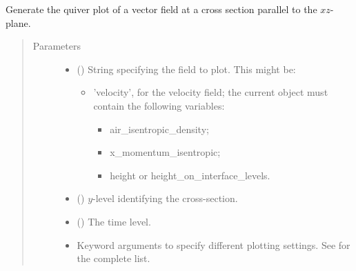 \documentclass[letterpaper,10pt,english]{sphinxmanual}
\begin{document}
\begin{fulllineitems}
\begin{fulllineitems}
\begin{quote}
\begin{description}
\begin{itemize}
\end{itemize}

\end{description}\end{quote}

\end{fulllineitems}


\begin{fulllineitems}
\label{\detokenize{api:tasmania.storages.state_isentropic.StateIsentropic.quiver_xz}}
Generate the quiver plot of a vector field at a cross section parallel to the \(xz\)-plane.
\begin{quote}\begin{description}
\item[{Parameters}] \leavevmode\begin{itemize}
\item {} 
 () \textendash{} 
String specifying the field to plot. This might be:
\begin{itemize}
\item {} 
’velocity’, for the velocity field; the current object must contain the following variables:
\begin{itemize}
\item {} 
air\_isentropic\_density;

\item {} 
x\_momentum\_isentropic;

\item {} 
height or height\_on\_interface\_levels.

\end{itemize}

\end{itemize}


\item {} 
 () \textendash{} \(y\)-level identifying the cross-section.

\item {} 
 () \textendash{} The time level.

\item {} 
 \textendash{} Keyword arguments to specify different plotting settings.
See {\hyperref[\detokenize{api:tasmania.utils.utils_plot.quiver_xz}]{}} for the complete list.


\end{itemize}
\end{description}
\end{quote}
\end{fulllineitems}
\end{fulllineitems}
\end{document}
